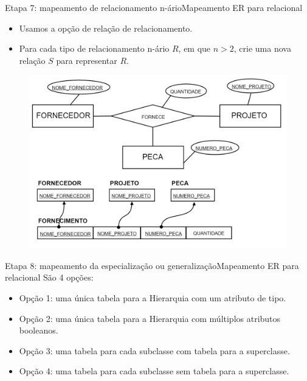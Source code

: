 \documentclass[t]{beamer}
\begin{document}

\begin{ftst}{Etapa 7: mapeamento de relacionamento n-ário}{Mapeamento ER para relacional}
\small
\begin{itemize}
    \item Usamos a opção de relação de relacionamento.
    \item Para cada tipo de relacionamento n-ário $R$, em que $n > 2$, crie uma nova relação $S$ para representar $R$.
\end{itemize}
\begin{figure}
    \centering
    \includegraphics[scale=0.15]{Figuras/03_12.png}
\end{figure}
\end{ftst}


\begin{ftst}{Etapa 8: mapeamento da especialização ou generalização}{Mapeamento ER para relacional}
\small
São 4 opções:
\begin{itemize}
    \item Opção 1: uma única tabela para a Hierarquia com um atributo de tipo.
    \item Opção 2: uma única tabela para a Hierarquia com múltiplos atributos booleanos.
    \item Opção 3: uma tabela para cada subclasse com tabela para a superclasse. 
    \item Opção 4: uma tabela para cada subclasse sem tabela para a superclasse. 
\end{itemize}
\end{ftst}
\end{document}
